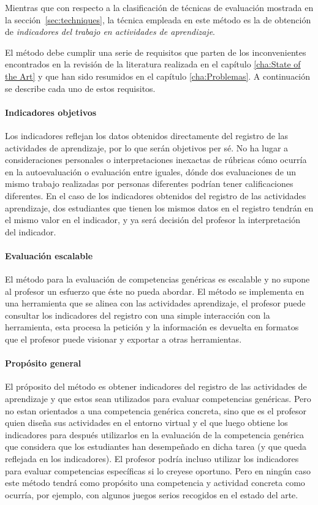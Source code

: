Mientras que con respecto a la clasificación de técnicas de evaluación mostrada en la sección~\ref{sec:techniques}, la técnica empleada en este método es la de obtención de \emph{indicadores del trabajo en actividades de aprendizaje}.

El método debe cumplir una serie de requisitos que parten de los inconvenientes encontrados en la revisión de la literatura realizada en el capítulo \ref{cha:State of the Art} y que han sido resumidos en el capítulo \ref{cha:Problemas}. A continuación se describe cada uno de estos requisitos.

\paragraph*{Indicadores objetivos}

Los indicadores reflejan los datos obtenidos directamente del registro de las actividades de aprendizaje, por lo que serán objetivos per sé. No ha lugar a consideraciones personales o interpretaciones inexactas de rúbricas cómo ocurría en la autoevaluación o evaluación entre iguales, dónde dos evaluaciones de un mismo trabajo realizadas por personas diferentes podrían tener calificaciones diferentes. En el caso de los indicadores obtenidos del registro de las actividades aprendizaje, dos estudiantes que tienen los mismos datos en el registro tendrán en el mismo valor en el indicador, y ya será decisión del profesor la interpretación del indicador.

\paragraph*{Evaluación escalable}

El método para la evaluación de competencias genéricas es escalable y no supone al profesor un esfuerzo que éste no pueda abordar. El método se implementa en una herramienta que se alinea con las actividades aprendizaje, el profesor puede consultar los indicadores del registro con una simple interacción con la herramienta, esta procesa la petición y la información es devuelta en formatos que el profesor puede visionar y exportar a otras herramientas.

\paragraph*{Propósito general}

El próposito del método es obtener indicadores del registro de las actividades de aprendizaje y que estos sean utilizados para evaluar competencias genéricas. Pero no estan orientados a una competencia genérica concreta, sino que es el profesor quien diseña sus actividades en el entorno virtual y el que luego obtiene los indicadores para después utilizarlos en la evaluación de la competencia genérica que considera que los estudiantes han desempeñado en dicha tarea (y que queda reflejada en los indicadores). El profesor podría incluso utilizar los indicadores para evaluar competencias específicas si lo creyese oportuno. Pero en ningún caso este método tendrá como propósito una competencia y actividad concreta como ocurría, por ejemplo, con algunos juegos serios recogidos en el estado del arte.

